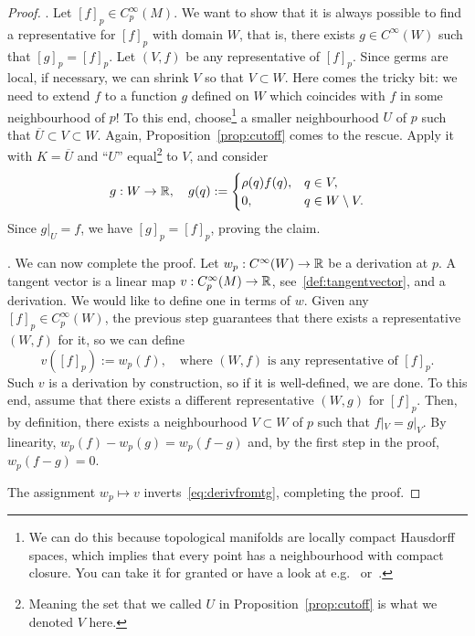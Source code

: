\begin{proof}
  .
  Let $[f]_p\in C_p^\infty(M)$.
  We want to show that it is always possible to find a representative for $[f]_p$ with domain $W$, that is, there exists $g\in C^\infty(W)$ such that $[g]_p = [f]_p$.
  Let $(V, f)$ be any representative of $[f]_p$.
  Since germs are local, if necessary, we can shrink $V$ so that $V\subset W$.
  Here comes the tricky bit: we need to extend $f$ to a function $g$ defined on $W$ which coincides with $f$ in some neighbourhood of $p$!
  To this end, choose\footnote{We can do this because topological manifolds are locally compact Hausdorff spaces, which implies that every point has a neighbourhood with compact closure. You can take it for granted or have a look at e.g.~\cite[Lemma 4.65]{book:lee:topology} or~\cite{book:munkres:topology}.} a smaller neighbourhood $U$ of $p$ such that $\overline{U}\subset V\subset W$.
  Again, Proposition~\ref{prop:cutoff} comes to the rescue. Apply it with $K=\overline{U}$ and ``$U$'' equal\footnote{Meaning the set that we called $U$ in Proposition~\ref{prop:cutoff} is what we denoted $V$ here.} to $V$, and consider
  \begin{equation}
    g:W\to\mathbb{R}, \quad
    g(q) := \begin{cases}
      \rho(q)f(q), & q\in V,             \\
      0,           & q \in W\setminus V.
    \end{cases}
  \end{equation}
  Since $g|_U = f$, we have $[g]_p = [f]_p$, proving the claim.

  . We can now complete the proof.
  Let $w_p:C^\infty(W) \to\mathbb{R}$ be a derivation at $p$.
  A tangent vector is a linear map $v:C_p^\infty(M)\to\mathbb{R}$, see~\eqref{def:tangentvector}, and a derivation.
  We would like to define one in terms of $w$.
  Given any $[f]_p\in C_p^\infty(W)$, the previous step guarantees that there exists a representative $(W,f)$ for it, so we can define
  \begin{equation}
    v([f]_p) := w_p(f), \quad\mbox{where $(W,f)$ is any representative of $[f]_p$}.
  \end{equation}
  Such $v$ is a derivation by construction, so if it is well-defined, we are done.
  To this end, assume that there exists a different representative $(W, g)$ for $[f]_p$.
  Then, by definition, there exists a neighbourhood $V\subset W$ of $p$ such that $f|_V = g|_V$.
  By linearity, $w_p(f) - w_p(g) = w_p(f-g)$ and, by the first step in the proof, $w_p(f-g) = 0$.

  The assignment $w_p\mapsto v$ inverts~\eqref{eq:derivfromtg}, completing the proof.
\end{proof}

